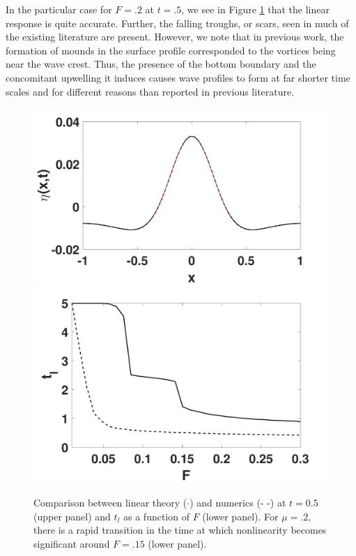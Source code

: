 \documentclass[a4paper,11pt]{article}
\begin{document}
In the particular case for $F=.2$ at $t=.5$, we see in Figure \ref{fig:linrep} that the linear response is quite accurate.  Further, the falling troughs, or scars, seen in much of the existing literature \cite{marcus,tryggvason} are present.  However, we note that in previous work, the formation of mounds in the surface profile corresponded to the vortices being near the wave crest.  Thus, the presence of the bottom boundary and the concomitant upwelling it induces causes wave profiles to form at far shorter time scales and for different reasons than reported in previous literature.  
\begin{figure}[!h]
\centering
\includegraphics[width=.7\textwidth]{lin_response_tf_pt5}
\includegraphics[width=.7\textwidth]{froude_lin}
\caption{\small Comparison between linear theory ($\cdot$) and numerics (- -) at $t=0.5$ (upper panel) and $t_{l}$ as a function of $F$ (lower panel).  For $\mu=.2$, there is a rapid transition in the time at which nonlinearity becomes significant around $F=.15$ (lower panel).}
\label{fig:linrep}
\end{figure}
\end{document}
